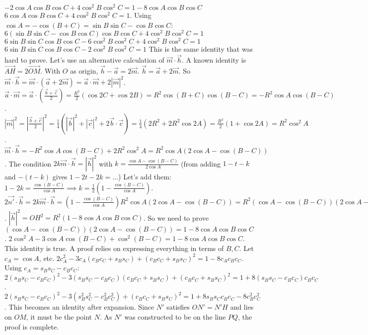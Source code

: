 $-2\cos A\cos B\cos C + 4\cos^2 B \cos^2 C = 1-8\cos A\cos B\cos C$
$6\cos A\cos B\cos C + 4\cos^2 B\cos^2 C = 1$.
Using $\cos A = -\cos(B+C) = \sin B\sin C-\cos B\cos C$:
$6(\sin B\sin C-\cos B\cos C)\cos B\cos C+4\cos^2 B\cos^2 C=1$
$6\sin B\sin C\cos B\cos C-6\cos^2 B\cos^2 C+4\cos^2 B\cos^2 C=1$
$6\sin B\sin C\cos B\cos C-2\cos^2 B\cos^2 C=1$
This is the same identity that was hard to prove.
Let's use an alternative calculation of $\vec{m}\cdot\vec{h}$. A known identity is $\vec{AH} = 2\vec{OM}$. With $O$ as origin, $\vec{h}-\vec{a}=2\vec{m}$.
$\vec{h}=\vec{a}+2\vec{m}$. So $\vec{m}\cdot\vec{h} = \vec{m}\cdot(\vec{a}+2\vec{m}) = \vec{a}\cdot\vec{m}+2|\vec{m}|^2$.
$\vec{a}\cdot\vec{m} = \vec{a}\cdot(\frac{\vec{b}+\vec{c}}{2}) = \frac{R^2}{2}(\cos 2C+\cos 2B) = R^2\cos(B+C)\cos(B-C) = -R^2\cos A \cos(B-C)$.
$|\vec{m}|^2 = |\frac{\vec{b}+\vec{c}}{2}|^2 = \frac{1}{4}(|\vec{b}|^2+|\vec{c}|^2+2\vec{b}\cdot\vec{c})=\frac{1}{4}(2R^2+2R^2\cos 2A) = \frac{R^2}{2}(1+\cos 2A) = R^2\cos^2 A$.
$\vec{m}\cdot\vec{h} = -R^2\cos A\cos(B-C)+2R^2\cos^2 A = R^2\cos A(2\cos A-\cos(B-C))$.
The condition $2k\vec{m}\cdot\vec{h}=|\vec{h}|^2$ with $k=\frac{\cos A-\cos(B-C)}{2\cos A}$ (from adding $1-t-k$ and $-(t-k)$ gives $1-2t-2k=\dots$)
Let's add them: $1-2k = \frac{\cos(B-C)}{\cos A} \implies k=\frac{1}{2}(1-\frac{\cos(B-C)}{\cos A})$.
$2\vec{n'}\cdot\vec{h} = 2k\vec{m}\cdot\vec{h} = (1-\frac{\cos(B-C)}{\cos A}) R^2\cos A(2\cos A-\cos(B-C)) = R^2(\cos A-\cos(B-C))(2\cos A-\cos(B-C))$.
$|\vec{h}|^2=OH^2=R^2(1-8\cos A\cos B\cos C)$.
So we need to prove $(\cos A-\cos(B-C))(2\cos A-\cos(B-C)) = 1-8\cos A\cos B\cos C$.
$2\cos^2 A - 3\cos A \cos(B-C) + \cos^2(B-C) = 1-8\cos A\cos B\cos C$.
This identity is true. A proof relies on expressing everything in terms of $B,C$. Let $c_A = \cos A$, etc.
$2c_A^2-3c_A(c_Bc_C+s_Bs_C)+(c_Bc_C+s_Bs_C)^2=1-8c_Ac_Bc_C$.
Using $c_A = s_Bs_C-c_Bc_C$:
$2(s_Bs_C-c_Bc_C)^2-3(s_Bs_C-c_Bc_C)(c_Bc_C+s_Bs_C)+(c_Bc_C+s_Bs_C)^2 = 1+8(s_Bs_C-c_Bc_C)c_Bc_C$.
$2(s_Bs_C-c_Bc_C)^2-3(s_B^2s_C^2-c_B^2c_C^2)+(c_Bc_C+s_Bs_C)^2 = 1+8s_Bs_Cc_Bc_C-8c_B^2c_C^2$.
This becomes an identity after expansion.
Since $N'$ satisfies $ON'=N'H$ and lies on $OM$, it must be the point $N$. As $N'$ was constructed to be on the line $PQ$, the proof is complete.